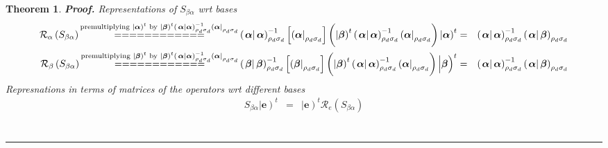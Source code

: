 \documentclass[aps,preprint]{revtex4}
\newtheorem{theorem}{Theorem}
\newenvironment{proof}[1][Proof]{\noindent\textbf{#1.} }{\ \rule{0.5em}{0.5em}}
\begin{document}
\begin{enumerate}
\begin{enumerate}
\begin{theorem}
\begin{proof}
Representations of $S_{\beta \alpha }$ wrt bases 
\begin{eqnarray}
\mathcal{R}_{\alpha }\left( S_{\beta \alpha }\right) \overset{\text{%
premultiplying }\left\vert \boldsymbol{\alpha }\right) ^{t}\text{ by }%
\left\vert \boldsymbol{\beta }\right) ^{t}\left( \left. \boldsymbol{\alpha }%
\right\vert \boldsymbol{\alpha }\right) _{\rho _{d}\sigma _{d}}^{-1}\left( 
\boldsymbol{\alpha }\right\vert _{\rho _{d}\sigma _{d}}}{{\Huge ============}%
}\left( \left. \boldsymbol{\alpha }\right\vert \boldsymbol{\alpha }\right)
_{\rho _{d}\sigma _{d}}^{-1}\left[ \overset{}{\left( \boldsymbol{\alpha }%
\right\vert _{\rho _{d}\sigma _{d}}}\right] \left( \overset{}{\left\vert 
\boldsymbol{\beta }\right) ^{t}\left( \left. \boldsymbol{\alpha }\right\vert 
\boldsymbol{\alpha }\right) _{\rho _{d}\sigma _{d}}^{-1}\left( \boldsymbol{%
\alpha }\right\vert _{\rho _{d}\sigma _{d}}}\right) \left\vert \overset{}{%
\boldsymbol{\alpha }}\right) ^{t} &=&\left( \left. \boldsymbol{\alpha }%
\right\vert \boldsymbol{\alpha }\right) _{\rho _{d}\sigma _{d}}^{-1}\left(
\left. \boldsymbol{\alpha }\right\vert \boldsymbol{\beta }\right) _{\rho
_{d}\sigma _{d}} \\
\mathcal{R}_{\beta }\left( S_{\beta \alpha }\right) \overset{\text{%
premultiplying }\left\vert \boldsymbol{\beta }\right) ^{t}\text{ by }%
\left\vert \boldsymbol{\beta }\right) ^{t}\left( \left. \boldsymbol{\alpha }%
\right\vert \boldsymbol{\alpha }\right) _{\rho _{d}\sigma _{d}}^{-1}\left( 
\boldsymbol{\alpha }\right\vert _{\rho _{d}\sigma _{d}}}{{\Huge ============}%
}\left( \left. \boldsymbol{\beta }\right\vert \boldsymbol{\beta }\right)
_{\rho _{d}\sigma _{d}}^{-1}\left[ \overset{}{\left( \boldsymbol{\beta }%
\right\vert _{\rho _{d}\sigma _{d}}}\right] \left( \overset{}{\left\vert 
\boldsymbol{\beta }\right) ^{t}\left( \left. \boldsymbol{\alpha }\right\vert 
\boldsymbol{\alpha }\right) _{\rho _{d}\sigma _{d}}^{-1}\left( \boldsymbol{%
\alpha }\right\vert _{\rho _{d}\sigma _{d}}}\right) \left\vert \overset{}{%
\boldsymbol{\beta }}\right) ^{t} &=&\left( \left. \boldsymbol{\alpha }%
\right\vert \boldsymbol{\alpha }\right) _{\rho _{d}\sigma _{d}}^{-1}\left(
\left. \boldsymbol{\alpha }\right\vert \boldsymbol{\beta }\right) _{\rho
_{d}\sigma _{d}}
\end{eqnarray}%
Represnations in terms of matrices of the operators wrt different bases 
\begin{eqnarray}
S_{\beta \alpha }\left\vert \boldsymbol{e}\right) ^{t} &=&\left\vert 
\boldsymbol{e}\right) ^{t}\mathcal{R}_{e}\left( S_{\beta \alpha }\right) \\

\end{eqnarray}
\end{proof}
\end{theorem}
\end{enumerate}
\end{enumerate}
\end{document}
